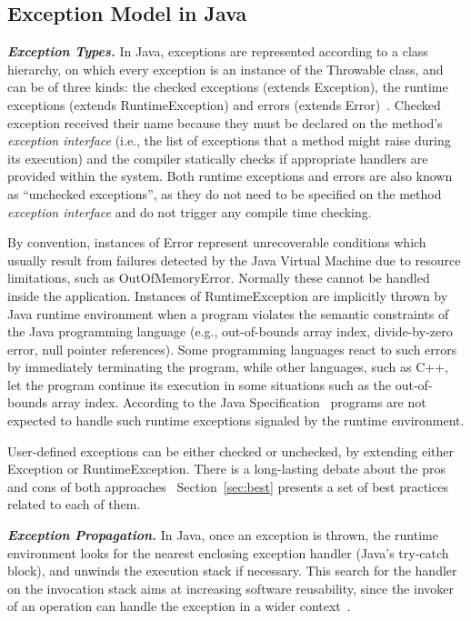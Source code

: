 \subsection{Exception Model in Java} \label{sec:extypes}

\emph{\textbf{Exception Types.}} In Java, exceptions are represented according to a class hierarchy, on which
 every exception is an instance of the Throwable class, and can be of three kinds: the checked exceptions
(extends Exception), the runtime exceptions (extends RuntimeException) and errors
(extends Error)~\cite{gosling2000java}. Checked exception received their name
 because they must be declared on the method's \emph{exception interface} (i.e., the list of exceptions that a method 
might raise during its execution) and the compiler statically checks if
 appropriate handlers are provided within the system.
Both runtime exceptions and errors are also known as ``unchecked exceptions'', as 
they do not need to be specified on the method \emph{exception interface} and do not trigger any 
compile time checking.

By convention, instances of Error represent  unrecoverable conditions which usually result
from failures detected by the Java Virtual Machine due to resource limitations, such as OutOfMemoryError.
Normally these cannot be handled inside the application.  Instances of RuntimeException are implicitly 
thrown by Java runtime environment when a program violates 
the semantic constraints of the Java programming language (e.g., out-of-bounds array index, divide-by-zero 
error, null pointer references). Some programming languages react to such errors by immediately terminating the program, while
other languages, such as C++, let the program  continue
 its execution in some situations such as the out-of-bounds array index.
According to the Java Specification~\cite{gosling2000java} programs are not 
expected to handle such runtime exceptions signaled by the runtime environment. 

User-defined exceptions can be either checked
 or unchecked, by extending either Exception or RuntimeException. There is a long-lasting debate 
about the pros and cons of both approaches~\cite{javatut,stackoverlow,debate}
Section~\ref{sec:best} presents
a set of best practices related to each of them.

\emph{\textbf{Exception Propagation.}} In Java, once an exception is thrown, 
the runtime environment looks for the nearest enclosing exception handler
(Java's try-catch block), and unwinds the execution stack if necessary.
This search for the handler on the invocation stack aims at increasing software reusability, 
since the invoker of an operation can handle the exception in a wider context~\cite{miller1997issues}.

